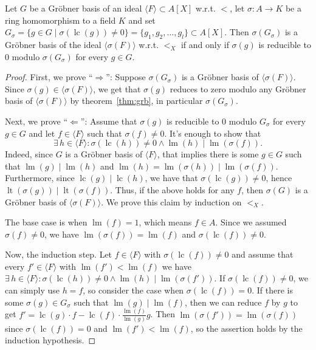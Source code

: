 \documentclass[a4paper, 12pt]{article}
\DeclareMathOperator{\LT}{lt}
\DeclareMathOperator{\LM}{lm}
\DeclareMathOperator{\LC}{lc}
\theoremstyle{changedot}
\theoremstyle{changedotbreak}
\theoremstyle{nonumberplain}
\newtheorem{proof}{Proof}
\begin{document}
\begin{lemma}\label{lem:grb_iff_reduc_to_z}
  Let $G$ be a Gröbner basis of an ideal $\langle F \rangle \subset A[X]$ w.r.t. $<$, let $\sigma : A \to K$ be a ring homomorphism to a field $K$ and set $G_{\sigma} = \{g \in G \mid \sigma(\LC(g)) \neq 0\} = \{g_{1}, g_{2}, \dots, g_{l}\} \subset A[X]$. Then $\sigma(G_{\sigma})$ is a Gröbner basis of the ideal $\langle \sigma(F) \rangle$ w.r.t. $<_{X}$ if and only if $\sigma(g)$ is reducible to 0 modulo $\sigma(G_{\sigma})$ for every $g \in G$.
\end{lemma}
\begin{proof}
  First, we prove ``$\Longrightarrow$'': Suppose $\sigma(G_{\sigma})$ is a Gröbner basis of $\langle \sigma(F) \rangle$. Since $\sigma(g) \in \langle \sigma(F) \rangle$, we get that $\sigma(g)$ reduces to zero modulo any Gröbner basis of $\langle \sigma(F) \rangle$ by theorem~\ref{thm:grb}, in particular $\sigma(G_{\sigma})$.

  Next, we prove ``$\Longleftarrow$'': Assume that $\sigma(g)$ is reducible to 0 modulo $G_{\sigma}$ for every $g \in G$ and let $f \in \langle F \rangle$ such that $\sigma(f) \neq 0$. It's enough to show that
  \[\exists\, h \in \langle F \rangle : \sigma(\LC(h)) \neq 0 \land \LM(h) \mid \LM(\sigma(f)).\]
  Indeed, since $G$ is a Gröbner basis of $\langle F \rangle$, that implies there is some $g \in G$ such that $\LM(g) \mid \LM(h)$ and $\LM(h) = \LM(\sigma(h)) \mid \LM(\sigma(f))$. Furthermore, since $\LC(g) \mid \LC(h)$, we have that $\sigma(\LC(g)) \neq 0$, hence $\LT(\sigma(g)) \mid \LT(\sigma(f))$. Thus, if the above holds for any $f$, then $\sigma(G)$ is a Gröbner basis of $\langle \sigma(F) \rangle$. We prove this claim by induction on $<_{X}$.

  The base case is when $\LM(f) = 1$, which means $f \in A$. Since we assumed $\sigma(f) \neq 0$, we have $\LM(\sigma(f)) = \LM(f)$ and $\sigma(\LC(f)) \neq 0$.

  Now, the induction step. Let $f \in \langle F \rangle$ with $\sigma(\LC(f)) \neq 0$ and assume that every $f' \in \langle F \rangle$ with $\LM(f') < \LM(f)$ we have $\exists\, h \in \langle F \rangle : \sigma(\LC(h)) \neq 0 \land \LM(h) \mid \LM(\sigma(f'))$. If $\sigma(\LC(f)) \neq 0$, we can simply use $h = f$, so consider the case when $\sigma(\LC(f)) = 0$. If there is some $\sigma(g) \in G_{\sigma}$ such that $\LM(g) \mid \LM(f)$, then we can reduce $f$ by $g$ to get $f' = \LC(g) \cdot f - \LC(f) \cdot \frac{\LM(f)}{\LM(g)}g$. Then $\LM(\sigma(f')) = \LM(\sigma(f))$ since $\sigma(\LC(f)) = 0$ and $\LM(f') < \LM(f)$, so the assertion holds by the induction hypothesis.


\end{proof}
\end{document}
